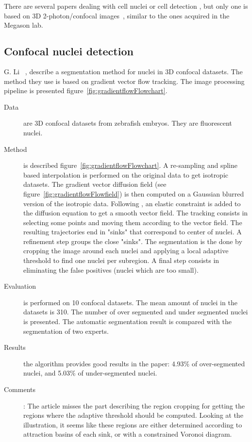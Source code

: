 There are several papers dealing with cell nuclei or cell detection 
\cite{loukas2003image,umesh2001efficient,al2009improved},
but only one is based on 3D 2-photon/confocal images~\cite{li20073},
similar to the ones acquired in the Megason lab.

\subsection*{Confocal nuclei detection}
G. Li {\etal}~\cite{li20073}, describe a segmentation method for nuclei in 3D confocal datasets. The method they use is based on gradient vector flow tracking.
The image processing pipeline is presented figure~\ref{fig:gradientflowFlowchart}.
\begin{description}
  \item[Data] are 3D confocal datasets from zebrafish embryos. They are fluorescent nuclei.
  \item[Method] is described figure~\ref{fig:gradientflowFlowchart}. 
  A re-sampling and spline based interpolation is performed on the original data to get isotropic datasets.
  The gradient vector diffusion field (see figure~\ref{fig:gradientflowFlowfield}) is then computed on a Gaussian blurred version of the isotropic data.
  Following \cite{bajcsy1989multiresolution}, an elastic constraint is added to the diffusion equation to get a smooth vector field.
  The tracking consists in selecting some points and moving them according to the vector field. The resulting trajectories end in "sinks" that correspond to center of nuclei.
  A refinement step groups the close "sinks".
  The segmentation is the done by cropping the image around each nuclei and applying a local adaptive threshold to find one nuclei per subregion.
  A final step consists in eliminating the false positives (nuclei which are too small).
  \item[Evaluation] is performed on 10 confocal datasets. The mean amount of nuclei in the datasets is 310. The number of over segmented and under segmented nuclei is presented. The automatic segmentation result is compared with the segmentation of two experts.
  \item[Results] the algorithm provides good results in the paper: 
  4.93\% of over-segmented nuclei,
  and 5.03\% of under-segmented nuclei.
  \item[Comments]:
  The article misses the part describing the region cropping for getting the regions where the adaptive
   threshold should be computed.
   Looking at the illustration, it seems like these regions are either determined
   according to attraction basins of each sink, or with a constrained Voronoi diagram.
\end{description}
